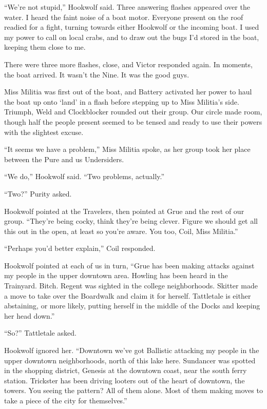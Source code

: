 ``We're not stupid,'' Hookwolf said.  Three answering flashes appeared over the water.  I heard the faint noise of a boat motor.  Everyone present on the roof readied for a fight, turning towards either Hookwolf or the incoming boat.  I used my power to call on local crabs, and to draw out the bugs I'd stored in the boat, keeping them close to me.



There were three more flashes, close, and Victor responded again.  In moments, the boat arrived.  It wasn't the Nine.  It was the good guys.



Miss Militia was first out of the boat, and Battery activated her power to haul the boat up onto `land' in a flash before stepping up to Miss Militia's side.  Triumph, Weld and Clockblocker rounded out their group.  Our circle made room, though half the people present seemed to be tensed and ready to use their powers with the slightest excuse.



``It seems we have a problem,'' Miss Militia spoke, as her group took her place between the Pure and us Undersiders.



``We do,'' Hookwolf said.  ``Two problems, actually.''



``Two?'' Purity asked.



Hookwolf pointed at the Travelers, then pointed at Grue and the rest of our group.  ``They're being cocky, think they're being clever.  Figure we should get all this out in the open, at least so you're aware.  You too, Coil, Miss Militia.''



``Perhaps you'd better explain,'' Coil responded.



Hookwolf pointed at each of us in turn, ``Grue has been making attacks against my people in the upper downtown area.  Howling has been heard in the Trainyard.  Bitch.  Regent was sighted in the college neighborhoods.  Skitter made a move to take over the Boardwalk and claim it for herself.  Tattletale is either abstaining, or more likely, putting herself in the middle of the Docks and keeping her head down.''



``So?'' Tattletale asked.



Hookwolf ignored her.  ``Downtown we've got Ballistic attacking my people in the upper downtown neighborhoods, north of this lake here.  Sundancer was spotted in the shopping district, Genesis at the downtown coast, near the south ferry station. Trickster has been driving looters out of the heart of downtown, the towers.  You seeing the pattern?  All of them alone.  Most of them making moves to take a piece of the city for themselves.''



